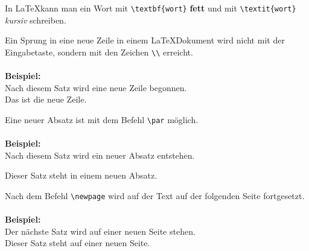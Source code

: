 In \LaTeX kann man ein Wort mit \lstinline|\textbf{wort}| \textbf{fett} und mit
\lstinline|\textit{wort}| \textit{kursiv} schreiben.\\
\par
Ein Sprung in eine neue Zeile in einem \LaTeX Dokument wird nicht mit
der Eingabetaste, sondern mit den Zeichen \lstinline|\\| erreicht.\\
\\
\textbf{Beispiel:}\\
Nach diesem Satz wird eine neue Zeile begonnen.\\
Das ist die neue Zeile.\\
\par
Eine neuer Absatz ist mit dem Befehl \lstinline|\par| möglich.\\
\\
\textbf{Beispiel:}\\
Nach diesem Satz wird ein neuer Absatz entstehen.\\
\par
Dieser Satz steht in einem neuen Absatz.\\
\par
Nach dem Befehl \lstinline|\newpage| wird auf der Text auf der folgenden Seite fortgesetzt.\\
\\
\textbf{Beispiel:}\\
Der nächste Satz wird auf einer neuen Seite stehen.\\
\newpage
Dieser Satz steht auf einer neuen Seite.
